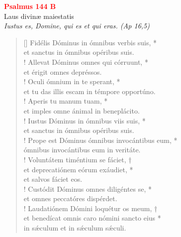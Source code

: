 \def\greinitialformat#1{%
{\fontsize{39}{39}\selectfont #1}%
}




\vspace{0.3cm}
\begin{center}
 \textcolor{red}{\large \bf Psalmus 144 B}\\
Laus divinæ maiestatis\\
\textit{\small Iustus es, Domine, qui es et qui eras. (Ap 16,5)}
\end{center}
\begin{verse}[\versewidth]
Fidélis Dóminus in ómnibus verbis suis, *\\
et sanctus in ómnibus opéribus suis.\\!
\vin Allevat Dóminus omnes qui córruunt, *\\
\vin et érigit omnes depréssos.\\!
Oculi ómnium in te sperant, *\\
et tu das illis escam in témpore opportúno.\\!
\vin Aperis tu manum tuam, *\\
\vin et imples omne ánimal in beneplácito.\\!
Iustus Dóminus in ómnibus viis suis, *\\
et sanctus in ómnibus opéribus suis.\\!
\vin Prope est Dóminus ómnibus invocántibus eum, *\\
\vin ómnibus invocántibus eum in veritáte.\\!
Voluntátem timéntium se fáciet, †\\
et deprecatiónem eórum exáudiet, *\\
et salvos fáciet eos.\\!
\vin Custódit Dóminus omnes diligéntes se, *\\
\vin et omnes peccatóres dispérdet.\\!
Laudatiónem Dómini loquétur os meum, †\\
et benedícat omnis caro nómini sancto eius *\\
in s\'{æ}culum et in s\'{æ}culum s\'{æ}culi.\\
\end{verse}
\vspace{1cm}


